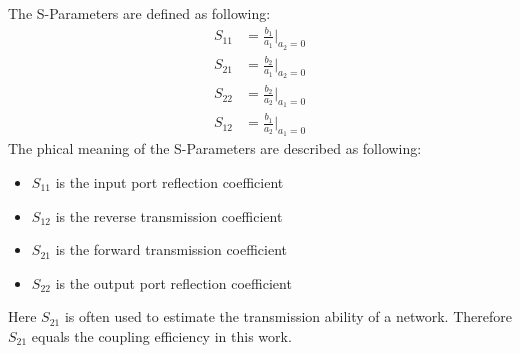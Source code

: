 The S-Parameters are defined as following:
\begin{align}
S_{11}&=\frac{b_{1}}{a_{1}}|_{a_{2}=0}\\
S_{21}&=\frac{b_{2}}{a_{1}}|_{a_{2}=0}\\
S_{22}&=\frac{b_{2}}{a_{2}}|_{a_{1}=0}\\
S_{12}&=\frac{b_{1}}{a_{2}}|_{a_{1}=0}
\end{align}
The phical meaning of the S-Parameters are described as following:
\begin{itemize}
\item $S_{11}$ is the input port reflection coefficient
\item $S_{12}$ is the reverse transmission coefficient
\item $S_{21}$ is the forward transmission coefficient
\item $S_{22}$ is the output port reflection coefficient
\end{itemize}
Here $S_{21}$ is often used to estimate the transmission ability of a network. Therefore $S_{21}$ equals the coupling efficiency in this work.
